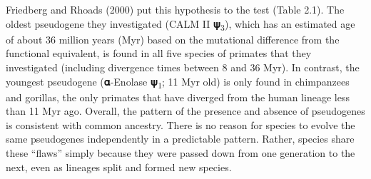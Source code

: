 \documentclass[
]{book}
\begin{document}
Friedberg and Rhoads (2000) put this hypothesis to the test (Table 2.1). The oldest pseudogene they investigated (CALM II 𝛙\textsubscript{3}), which has an estimated age of about 36 million years (Myr) based on the mutational difference from the functional equivalent, is found in all five species of primates that they investigated (including divergence times between 8 and 36 Myr). In contrast, the youngest pseudogene (𝛂-Enolase 𝛙\textsubscript{1}; 11 Myr old) is only found in chimpanzees and gorillas, the only primates that have diverged from the human lineage less than 11 Myr ago. Overall, the pattern of the presence and absence of pseudogenes is consistent with common ancestry. There is no reason for species to evolve the same pseudogenes independently in a predictable pattern. Rather, species share these ``flaws'' simply because they were passed down from one generation to the next, even as lineages split and formed new species.
\end{document}
